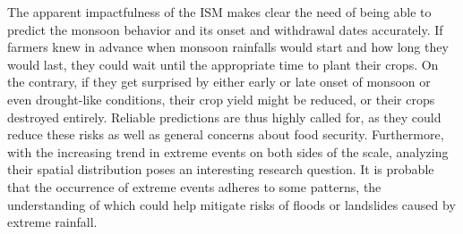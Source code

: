 The apparent impactfulness of the ISM makes clear the need of being able to predict the monsoon behavior and its onset and withdrawal dates accurately. If farmers knew in advance when monsoon rainfalls would start and how long they would last, they could wait until the appropriate time to plant their crops. On the contrary, if they get surprised by either early or late onset of monsoon or even drought-like conditions, their crop yield might be reduced, or their crops destroyed entirely. Reliable predictions are thus highly called for, as they could reduce these risks as well as general concerns about food security. Furthermore, with the increasing trend in extreme events on both sides of the scale, analyzing their spatial distribution poses an interesting research question. It is probable that the occurrence of extreme events adheres to some patterns, the understanding of which could help mitigate risks of floods or landslides caused by extreme rainfall.







